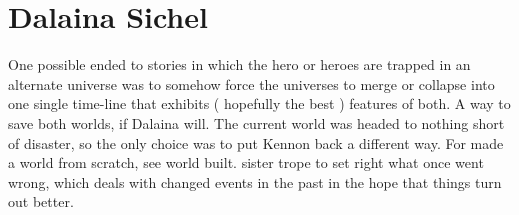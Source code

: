 \documentclass[12pt]{book}
\begin{document}
\chapter{Dalaina Sichel}

One possible ended to stories in which the hero or heroes are trapped in an alternate universe was to somehow force the universes to merge or collapse into one single time-line that exhibits ( hopefully the best ) features of both. A way to save both worlds, if Dalaina will. The current world was headed to nothing short of disaster, so the only choice was to put Kennon back a different way. For made a world from scratch, see world built. sister trope to set right what once went wrong, which deals with changed events in the past in the hope that things turn out better.
\end{document}

